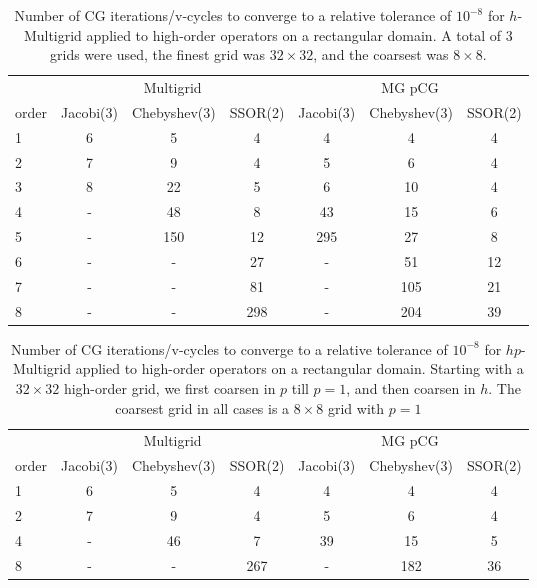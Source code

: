 \begin{table}
  \caption{\label{tab:homg} Number of CG iterations/v-cycles to converge to a relative tolerance of $10^{-8}$ for $h$-Multigrid applied to high-order operators on a rectangular domain. A total of 3 grids were used, the finest grid was $32\times 32$, and the coarsest was $8\times 8$.}
		\centering
    \begin{tabular}{|l|c|c|c|c|c|c|} 
	    \hline
				    & \multicolumn{3}{c|}{Multigrid} & \multicolumn{3}{c|}{MG pCG}\\  \cline{2-7}
			order & \scriptsize Jacobi(3)  &\scriptsize  Chebyshev(3)  &\scriptsize SSOR(2) &\scriptsize Jacobi(3)  &\scriptsize  Chebyshev(3)  &\scriptsize SSOR(2) \\
			\hline
				1 & 6 &  5 & 4  &  4  & 4  & 4 \\ 
	    	2 & 7 &  9 & 4  &  5  & 6  & 4 \\
				3 & 8 & 22 & 5  &  6  & 10 & 4 \\
				4 & - & 48 & 8  & 43  & 15 & 6 \\
				5 & - & 150 & 12 & 295 & 27 & 8 \\
				6 & - & - & 27  & - & 51 & 12 \\
				7 & - & - & 81 & - & 105 & 21 \\
				8 & - & - & 298 & - & 204 & 39 \\
			\hline
	  \end{tabular}
\end{table}

\begin{table}
  \caption{\label{tab:hpmg} Number of CG iterations/v-cycles to converge to a relative tolerance of $10^{-8}$ for $hp$-Multigrid applied to high-order operators on a rectangular domain. Starting with a $32\times 32$ high-order grid, we first coarsen in $p$ till $p=1$, and then coarsen in $h$. The coarsest grid in all cases is a $8\times 8$ grid with $p=1$}
		\centering
		\begin{tabular}{|l|c|c|c|c|c|c|} 
	    \hline
				    & \multicolumn{3}{c|}{Multigrid} & \multicolumn{3}{c|}{MG pCG}\\  \cline{2-7}
			order & \scriptsize Jacobi(3)  &\scriptsize  Chebyshev(3)  &\scriptsize SSOR(2) &\scriptsize Jacobi(3)  &\scriptsize  Chebyshev(3)  &\scriptsize SSOR(2) \\
			\hline
				1 & 6  &  5 &  4 & 4 & 4 & 4 \\ 
	    	2 & 7 & 9  & 4 & 5 & 6 & 4 \\
				4 & - & 46 & 7 & 39 & 15 & 5 \\
				8 & - & - & 267 & - & 182 & 36 \\
			\hline
	  \end{tabular}
\end{table}


